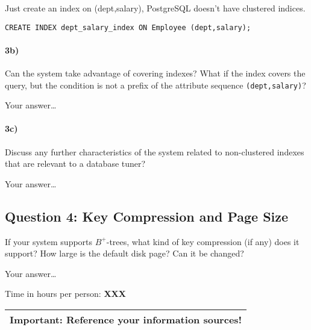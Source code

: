 \documentclass[11pt]{scrartcl}
\begin{document}
\smallskip

Just create an index on (dept,salary), PostgreSQL doesn't have clustered indices.

{\small
\begin{verbatim}
CREATE INDEX dept_salary_index ON Employee (dept,salary);
\end{verbatim}
}

\paragraph{3b)} Can the system take advantage of covering indexes? What if the
index covers the query, but the condition is not a prefix of the
attribute sequence {\tt (dept,salary)}?


\smallskip

Your answer\dots

\paragraph{3c)} Discuss any further characteristics of the system related to
non-clustered indexes that are relevant to a database tuner?

\smallskip

Your answer\dots

\subsection*{Question 4: Key Compression and Page Size} If your system
supports $B^+$-trees, what kind of key compression (if any) does it
support?  How large is the default disk page? Can it be changed?


\smallskip

Your answer\dots


\bigskip

\noindent Time in hours per person: {\bf XXX}

\bigskip

\begin{center}
  \begin{tabular}{c}
    \hline
    {\bf Important:} Reference your information sources!
    \\\hline
  \end{tabular}
\end{center}
\end{document}
